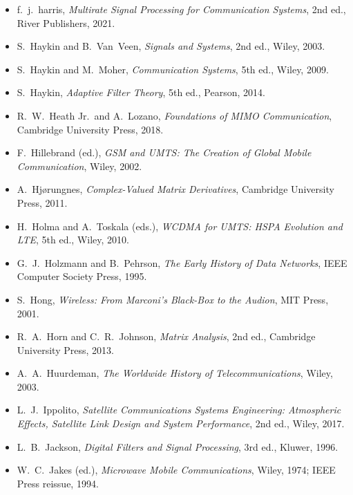 \begin{itemize}[leftmargin=1.5em,itemindent=-1.5em,itemsep=1.5pt plus 1pt,parsep=0pt,topsep=4pt,label={}]
\item f.~j.~harris, \emph{Multirate Signal Processing for Communication Systems}, 2nd ed., River Publishers, 2021.
\item S.~Haykin and B.~Van~Veen, \emph{Signals and Systems}, 2nd ed., Wiley, 2003.
\item S.~Haykin and M.~Moher, \emph{Communication Systems}, 5th ed., Wiley, 2009.
\item S.~Haykin, \emph{Adaptive Filter Theory}, 5th ed., Pearson, 2014.
\item R.~W.~Heath Jr.\ and A.~Lozano, \emph{Foundations of MIMO Communication}, Cambridge University Press, 2018.
\item F.~Hillebrand (ed.), \emph{GSM and UMTS: The Creation of Global Mobile Communication}, Wiley, 2002.
\item A.~Hj{\o}rungnes, \emph{Complex-Valued Matrix Derivatives}, Cambridge University Press, 2011.
\item H.~Holma and A.~Toskala (eds.), \emph{WCDMA for UMTS: HSPA Evolution and LTE}, 5th ed., Wiley, 2010.
\item G.~J.~Holzmann and B.~Pehrson, \emph{The Early History of Data Networks}, IEEE Computer Society Press, 1995.
\item S.~Hong, \emph{Wireless: From Marconi's Black-Box to the Audion}, MIT Press, 2001.
\item R.~A.~Horn and C.~R.~Johnson, \emph{Matrix Analysis}, 2nd ed., Cambridge University Press, 2013.
\item A.~A.~Huurdeman, \emph{The Worldwide History of Telecommunications}, Wiley, 2003.
\item L.~J.~Ippolito, \emph{Satellite Communications Systems Engineering: Atmospheric Effects, Satellite Link Design and System Performance}, 2nd ed., Wiley, 2017.
\item L.~B.~Jackson, \emph{Digital Filters and Signal Processing}, 3rd ed., Kluwer, 1996.
\item W.~C.~Jakes (ed.), \emph{Microwave Mobile Communications}, Wiley, 1974; IEEE Press reissue, 1994.

\end{itemize}
